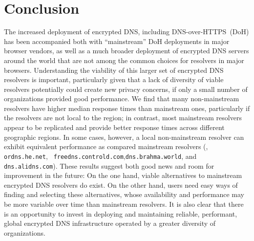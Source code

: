 \section{Conclusion}\label{sec:conclusion}

The increased deployment of encrypted DNS, including DNS-over-HTTPS~(DoH) has
been accompanied both with ``mainstream'' DoH deployments in major browser
vendors, as well as a much broader deployment of encrypted DNS servers around
the world that are not among the common choices for resolvers in major
browsers.  Understanding the viability of this larger set of encrypted DNS
resolvers is important, particularly given that a lack of diversity of viable
resolvers potentially could create new privacy concerns, if only a small
number of organizations provided good performance. 
%
We find that many non-mainstream resolvers have higher median response times
than mainstream ones, particularly if the resolvers are not local to the
region; in contrast, most mainstream resolvers appear to be replicated and
provide better response times across different geographic regions. In some
cases, however, a local non-mainstream resolver can exhibit equivalent
performance as compared mainstream resolvers (\eg, {\tt ordns.he.net}, {\tt
freedns.controld.com},{\tt dns.brahma.world}, and {\tt dns.alidns.com}). These
results suggest both good news and room for improvement in the future: On the
one hand, viable alternatives to mainstream encrypted DNS resolvers do exist.
On the other hand, users need easy ways of finding and selecting these
alternatives, whose availability and performance may be more variable over
time than mainstream resolvers. It is also clear that there is an opportunity
to invest in deploying and maintaining reliable, performant, global encrypted
DNS infrastructure operated by a greater diversity of organizations.

